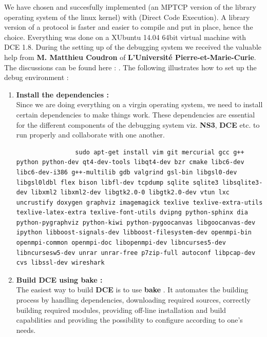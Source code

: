 \documentclass[a4paper,11pt]{article}
\begin{document}
		We have chosen and succesfully implemented \cite[LibOS]{libos} (an MPTCP version of the library operating system of the linux kernel) with \cite[DCE]{dce} (Direct Code Execution). A library version of a protocol is faster and easier to compile and put in place, hence the choice. Everything was done on a XUbuntu 14.04 64bit virtual machine with DCE 1.8. During the setting up of the debugging system we received the valuable help from \textbf{M. Matthieu Coudron} of \textbf{L'Université Pierre-et-Marie-Curie}. The discussions can be found here : \cite[ns-3-dce]{ns-3-dce}. The following illustrates how to set up the debug environment :

		\begin{enumerate}
			
			\item \textbf{Install the dependencies :} \\Since we are doing everything on a virgin operating system, we need to install certain dependencies to make things work. These dependencies are essential for the different components of the debugging system viz. \textbf{NS3}, \textbf{DCE} etc. to run properly and collaborate with one another.
				
			\begin{lstlisting}
				sudo apt-get install vim git mercurial gcc g++ python python-dev qt4-dev-tools libqt4-dev bzr cmake libc6-dev libc6-dev-i386 g++-multilib gdb valgrind gsl-bin libgsl0-dev libgsl0ldbl flex bison libfl-dev tcpdump sqlite sqlite3 libsqlite3-dev libxml2 libxml2-dev libgtk2.0-0 libgtk2.0-dev vtun lxc uncrustify doxygen graphviz imagemagick texlive texlive-extra-utils texlive-latex-extra texlive-font-utils dvipng python-sphinx dia python-pygraphviz python-kiwi python-pygoocanvas libgoocanvas-dev ipython libboost-signals-dev libboost-filesystem-dev openmpi-bin openmpi-common openmpi-doc libopenmpi-dev libncurses5-dev libncursesw5-dev unrar unrar-free p7zip-full autoconf libpcap-dev cvs libssl-dev wireshark
			\end{lstlisting}

			\item \textbf{Build DCE using bake :} \\The easiest way to build \textbf{DCE} is to use \textbf{bake} \cite[bake]{bake}. It automates the building process by handling dependencies, downloading required sources, correctly building required modules, providing off-line installation and build capabilities and providing the possibility to configure according to one's needs.


\end{enumerate}
\end{document}
